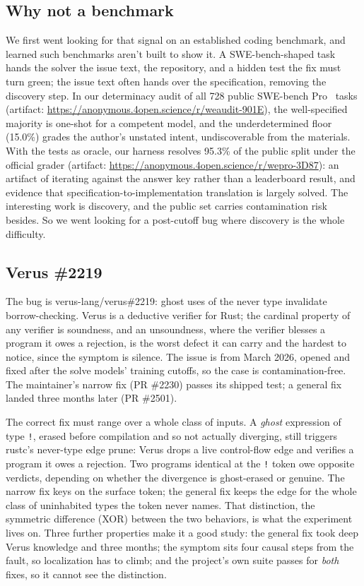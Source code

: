 \documentclass[sigconf,review,anonymous]{acmart}
\begin{document}
\subsection{Why not a benchmark}

We first went looking for that signal on an established coding benchmark, and learned such benchmarks aren't built to show it. A SWE-bench-shaped task hands the solver the issue text, the repository, and a hidden test the fix must turn green; the issue text often hands over the specification, removing the discovery step. In our determinacy audit of all 728 public SWE-bench Pro~\cite{swebenchpro} tasks (artifact: \url{https://anonymous.4open.science/r/weaudit-901E}), the well-specified majority is one-shot for a competent model, and the underdetermined floor (15.0\%) grades the author's unstated intent, undiscoverable from the materials. With the tests as oracle, our harness resolves 95.3\% of the public split under the official grader (artifact: \url{https://anonymous.4open.science/r/wepro-3D87}): an artifact of iterating against the answer key rather than a leaderboard result, and evidence that specification-to-implementation translation is largely solved. The interesting work is discovery, and the public set carries contamination risk besides. So we went looking for a post-cutoff bug where discovery is the whole difficulty.

\subsection{Verus \#2219}

The bug is verus-lang/verus\#2219: ghost uses of the never type invalidate borrow-checking. Verus is a deductive verifier for Rust; the cardinal property of any verifier is soundness, and an unsoundness, where the verifier blesses a program it owes a rejection, is the worst defect it can carry and the hardest to notice, since the symptom is silence. The issue is from March 2026, opened and fixed after the solve models' training cutoffs, so the case is contamination-free. The maintainer's narrow fix (PR \#2230) passes its shipped test; a general fix landed three months later (PR \#2501).

The correct fix must range over a whole class of inputs. A \emph{ghost} expression of type \texttt{!}, erased before compilation and so not actually diverging, still triggers rustc's never-type edge prune: Verus drops a live control-flow edge and verifies a program it owes a rejection. Two programs identical at the \texttt{!} token owe opposite verdicts, depending on whether the divergence is ghost-erased or genuine. The narrow fix keys on the surface token; the general fix keeps the edge for the whole class of uninhabited types the token never names. That distinction, the symmetric difference (XOR) between the two behaviors, is what the experiment lives on. Three further properties make it a good study: the general fix took deep Verus knowledge and three months; the symptom sits four causal steps from the fault, so localization has to climb; and the project's own suite passes for \emph{both} fixes, so it cannot see the distinction.
\end{document}
